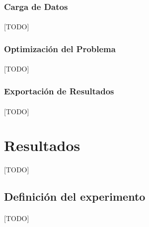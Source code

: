 \documentclass{subfiles}
\begin{document}
        \subsubsection{Carga de Datos}
        \label{sec:implementation_components_data_loading}

          \paragraph{}
          [TODO]

        \subsubsection{Optimización del Problema}
        \label{sec:implementation_components_optimization}

          \paragraph{}
          [TODO]

        \subsubsection{Exportación de Resultados}
        \label{sec:implementation_components_exportation}

          \paragraph{}
          [TODO]

    \section{Resultados}
    \label{sec:results}

      \paragraph{}
      [TODO]

      \subsection{Definición del experimento}
      \label{sec:results_definition}

        \paragraph{}
        [TODO]
\end{document}
